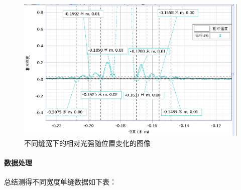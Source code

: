 \documentclass[a4paper]{../phyreport}
\begin{document}
\begin{figure}[H]
\begin{minipage}[b]{0.45\linewidth}
  \end{minipage}
  \begin{minipage}[b]{0.45\linewidth}
    \centering
\includegraphics[width=0.9\linewidth]{fig/单峰/0.16.png}
  \end{minipage}
  \caption{不同缝宽下的相对光强随位置变化的图像}
  \label{单缝}
\end{figure}


\paragraph{数据处理}
总结测得不同宽度单缝数据如下表：
\end{document}
